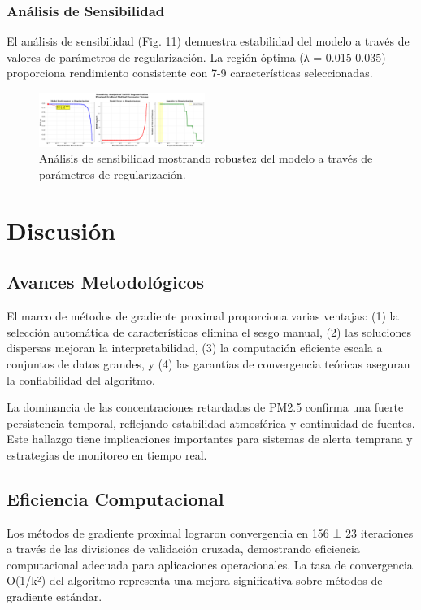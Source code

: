\documentclass[conference]{IEEEtran}
\begin{document}
\subsubsection{Análisis de Sensibilidad}

El análisis de sensibilidad (Fig. 11) demuestra estabilidad del modelo a través de valores de parámetros de regularización. La región óptima (λ = 0.015-0.035) proporciona rendimiento consistente con 7-9 características seleccionadas.

\begin{figure}[htbp]
\centerline{\includegraphics[width=0.48\textwidth]{Figura_11_Analisis_Sensibilidad_PM25.png}}
\caption{Análisis de sensibilidad mostrando robustez del modelo a través de parámetros de regularización.}
\label{fig:sensitivity}
\end{figure}

\section{Discusión}

\subsection{Avances Metodológicos}

El marco de métodos de gradiente proximal proporciona varias ventajas: (1) la selección automática de características elimina el sesgo manual, (2) las soluciones dispersas mejoran la interpretabilidad, (3) la computación eficiente escala a conjuntos de datos grandes, y (4) las garantías de convergencia teóricas aseguran la confiabilidad del algoritmo.

La dominancia de las concentraciones retardadas de PM2.5 confirma una fuerte persistencia temporal, reflejando estabilidad atmosférica y continuidad de fuentes. Este hallazgo tiene implicaciones importantes para sistemas de alerta temprana y estrategias de monitoreo en tiempo real.

\subsection{Eficiencia Computacional}

Los métodos de gradiente proximal lograron convergencia en 156 ± 23 iteraciones a través de las divisiones de validación cruzada, demostrando eficiencia computacional adecuada para aplicaciones operacionales. La tasa de convergencia O(1/k²) del algoritmo representa una mejora significativa sobre métodos de gradiente estándar.
\end{document}
